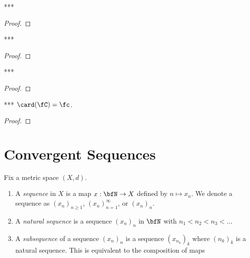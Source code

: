     \begin{lemma}***
        
    \end{lemma}
        \begin{proof}
            
        \end{proof}

    \begin{lemma}***
    
    \end{lemma}
        \begin{proof}
            
        \end{proof}

    \begin{lemma}***

    \end{lemma}
        \begin{proof}
            
        \end{proof}

    \begin{proposition}***
        $\card(\fC) = \fc$.
    \end{proposition}
        \begin{proof}
            
        \end{proof}

\section{Convergent Sequences}
    \begin{definition}
        Fix a metric space $(X,d)$.
        \begin{enumerate}[label = (\arabic*),itemsep=1pt,topsep=3pt]
            \item A \textit{sequence} in $X$ is a map $x:\bfN \rightarrow X$ defined by $n \mapsto x_n$. We denote a sequence as $(x_n)_{n \geq 1}$, $(x_n)_{n = 1}^\infty$, or $(x_n)_n$.
            
            \item A \textit{natural sequence} is a sequence $(x_n)_n$ in $\bfN$ with $n_1 < n_2 < n_3 < ...$
            
            \item A \textit{subsequence} of a sequence $(x_n)_n$ is a sequence $(x_{n_k})_k$ where $(n_k)_k$ is a natural sequence. This is equivalent to the composition of maps
        \end{enumerate}
    \end{definition}

